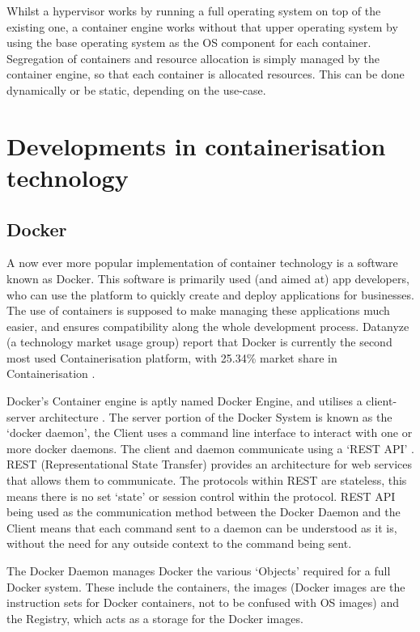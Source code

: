 Whilst a hypervisor works by running a full operating system on top of the existing one, a container engine works without that upper operating system by using the base operating system as the OS component for each container. Segregation of containers and resource allocation is simply managed by the container engine, so that each container is allocated resources. This can be done dynamically or be static, depending on the use-case.

\section{Developments in containerisation technology}

\subsection{Docker}
A now ever more popular implementation of container technology is a software known as Docker. This software is primarily used (and aimed at) app developers, who can use the platform to quickly create and deploy applications for businesses. The use of containers is supposed to make managing these applications much easier, and ensures compatibility along the whole development process.
Datanyze (a technology market usage group) report that Docker is currently the second most used Containerisation platform, with 25.34\% market share in Containerisation \citep{datanyze}. 

Docker's Container engine is aptly named Docker Engine, and utilises a client-server architecture \citep[Section: Docker architecture]{DockerOverview}. The server portion of the Docker System is known as the `docker daemon', the Client uses a command line interface to interact with one or more docker daemons. The client and daemon communicate using a `REST API' \citep[Section: The Docker daemon]{DockerOverview}. REST (Representational State Transfer) provides an architecture for web services \citep{W3Architecture2004} that allows them to communicate. The protocols within REST are stateless, this means there is no set `state' or session control within the protocol. REST API being used as the communication method between the Docker Daemon and the Client means that each command sent to a daemon can be understood as it is, without the need for any outside context to the command being sent.

The Docker Daemon manages Docker the various `Objects' \citep[Section: Docker objects]{DockerOverview} required for a full Docker system. These include the containers, the images (Docker images are the instruction sets for Docker containers, not to be confused with OS images) and the Registry, which acts as a storage for the Docker images.


